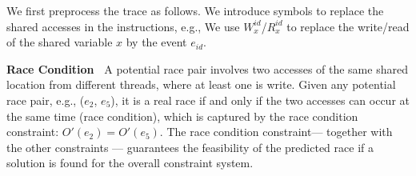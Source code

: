 








We first preprocess the trace as follows. We introduce symbols to replace 
the shared accesses in the instructions, e.g., We use 
$W^{id}_{x}$/$R^{id}_{x}$ to replace the write/read of the shared 
variable $x$ by the 
event $e_{id}$. %

{\bf Race Condition\ } A potential race pair involves two accesses of 
the same shared location from different threads, where at least one is write. 
Given any potential race pair, e.g., ($e_2$, $e_5$), it is a real race 
if and only if the two accesses can occur at the same time (race condition), 
which is captured by the race condition constraint: $O'(e_2) = O'(e_5)$.
The race condition constraint--- together with the other constraints --- 
guarantees the feasibility of the predicted race if a solution is found 
for the overall constraint system.

